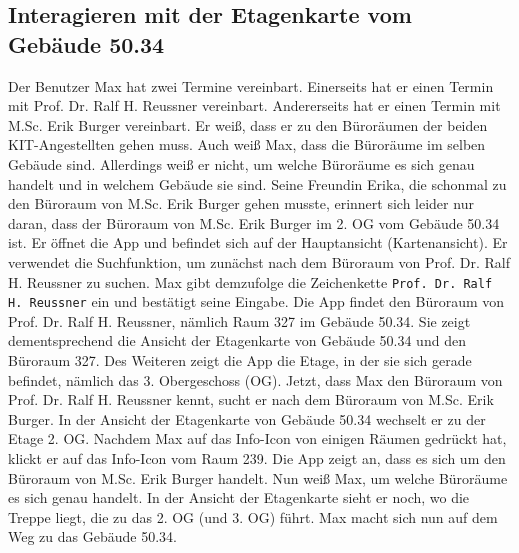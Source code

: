 \subsection{Interagieren mit der Etagenkarte vom Gebäude 50.34}

Der Benutzer Max hat zwei Termine vereinbart.
Einerseits hat er einen Termin mit Prof. Dr. Ralf H. Reussner vereinbart.
Andererseits hat er einen Termin mit M.Sc. Erik Burger vereinbart.
Er weiß, dass er zu den Büroräumen der beiden KIT-Angestellten gehen muss.
Auch weiß Max, dass die Büroräume im selben Gebäude sind.
Allerdings weiß er nicht, um welche Büroräume es sich genau handelt und in welchem Gebäude sie sind.
Seine Freundin Erika, die schonmal zu den Büroraum von M.Sc. Erik Burger gehen musste, erinnert sich leider nur daran, dass der Büroraum von M.Sc. Erik Burger im 2. OG vom Gebäude 50.34 ist.
Er öffnet die App und befindet sich auf der Hauptansicht (Kartenansicht).
Er verwendet die Suchfunktion, um zunächst nach dem Büroraum von Prof. Dr. Ralf H. Reussner zu suchen.
Max gibt demzufolge die Zeichenkette \texttt{Prof. Dr. Ralf H. Reussner} ein und bestätigt seine Eingabe.
Die App findet den Büroraum von Prof. Dr. Ralf H. Reussner, nämlich Raum 327 im Gebäude 50.34.
Sie zeigt dementsprechend die Ansicht der Etagenkarte von Gebäude 50.34 und den Büroraum 327.
Des Weiteren zeigt die App die Etage, in der sie sich gerade befindet, nämlich das 3. Obergeschoss (OG).
Jetzt, dass Max den Büroraum von Prof. Dr. Ralf H. Reussner kennt, sucht er nach dem Büroraum von M.Sc. Erik Burger.
In der Ansicht der Etagenkarte von Gebäude 50.34 wechselt er zu der Etage 2. OG.
Nachdem Max auf das Info-Icon von einigen Räumen gedrückt hat, klickt er auf das Info-Icon vom Raum 239.
Die App zeigt an, dass es sich um den Büroraum von M.Sc. Erik Burger handelt.
Nun weiß Max, um welche Büroräume es sich genau handelt.
In der Ansicht der Etagenkarte sieht er noch, wo die Treppe liegt, die zu das 2. OG (und 3. OG) führt.
Max macht sich nun auf dem Weg zu das Gebäude 50.34.